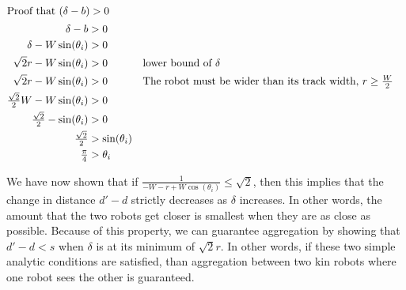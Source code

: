 \documentclass[conference]{IEEEtran}
\begin{document}
{      \begin{align*}
        \intertext{Proof that $(\delta-b)>0$}
        \delta - b &> 0 \\
        \delta - W\sin(\theta_i) &> 0 \\
        \sqrt{2}r - W\sin(\theta_i) &> 0 && \text{lower bound of }\delta \\
        \sqrt{2}r - W\sin(\theta_i) &> 0 && \text{The robot must be wider than its track width, } r \geq \tfrac{W}{2} \\
        \tfrac{\sqrt{2}}{2}W - W\sin(\theta_i) &> 0 \\
        \tfrac{\sqrt{2}}{2} - \sin(\theta_i) &> 0 \\
        \tfrac{\sqrt{2}}{2} &> \sin(\theta_i) \\
        \tfrac{\pi}{4} &> \theta_i \\
      \end{align*}
    }

    We have now shown that if $\frac{1}{-W-r+W\cos(\theta_i)} \leq \sqrt{2}$, then this implies that the change in distance $d'-d$ strictly decreases as $\delta$ increases. In other words, the amount that the two robots get closer is smallest when they are as close as possible. Because of this property, we can guarantee aggregation by showing that $d'-d<s$ when $\delta$ is at its minimum of $\sqrt{2}r$. In other words, if these two simple analytic conditions are satisfied, than aggregation between two kin robots where one robot sees the other is guaranteed.
\end{document}
